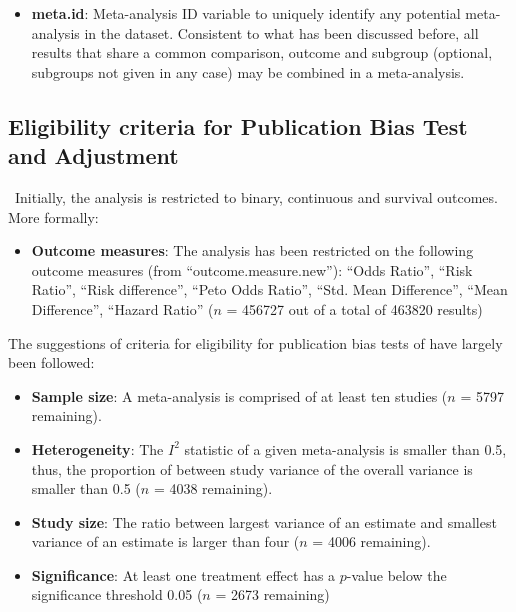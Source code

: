 \documentclass[11pt,a4paper,twoside]{book}\usepackage[]{graphicx}\usepackage[]{color}
\begin{document}
\begin{itemize}
\item \textbf{meta.id}: Meta-analysis ID variable to uniquely identify any potential meta-analysis in the dataset. Consistent to what has been discussed before, all results that share a common comparison, outcome and subgroup (optional, subgroups not given in any case) may be combined in a meta-analysis.
\end{itemize}


\subsection{Eligibility criteria for Publication Bias Test and Adjustment} \
Initially, the analysis is restricted to binary, continuous and survival outcomes. More formally:
\begin{itemize}
\item \textbf{Outcome measures}: The analysis has been restricted on the following outcome measures (from ``outcome.measure.new''): ``Odds Ratio'', ``Risk Ratio'', ``Risk difference'', ``Peto Odds Ratio'', ``Std. Mean Difference'', ``Mean Difference'', ``Hazard Ratio'' 
($n$ = 456727 out of a total of 463820 results)
\end{itemize}

The suggestions of criteria for eligibility for publication bias tests of \citet{Ioannidis2007} have largely been followed:
\begin{itemize}
\item \textbf{Sample size}: A meta-analysis is comprised of at least ten studies ($n$ = 5797 remaining). 
\item \textbf{Heterogeneity}: The $I^2$ statistic of a given meta-analysis is smaller than 0.5, thus, the proportion of between study variance of the overall variance is smaller than 0.5 ($n$ = 4038 remaining).
\item \textbf{Study size}: The ratio between largest variance of an estimate and smallest variance of an estimate is larger than four ($n$ = 4006 remaining).
\item \textbf{Significance}: At least one treatment effect has a $p$-value below the significance threshold 0.05 ($n$ = 2673 remaining)
\end{itemize}
\end{document}
